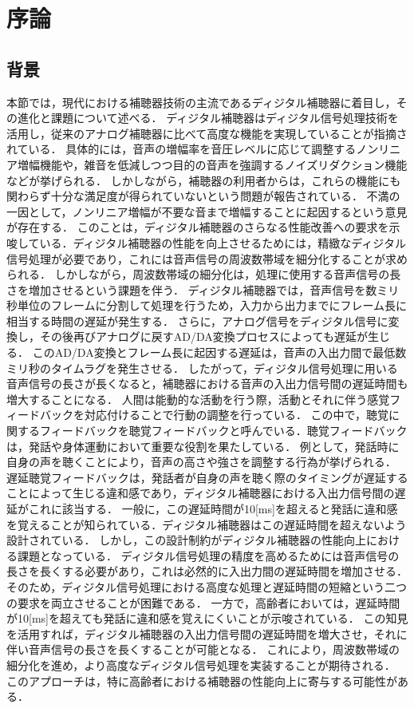 \chapter{序論}

\section{背景}
本節では，現代における補聴器技術の主流であるディジタル補聴器に着目し，その進化と課題について述べる．
ディジタル補聴器はディジタル信号処理技術を活用し，従来のアナログ補聴器に比べて高度な機能を実現していることが指摘されている\cite{EaringAids_20}．
具体的には，音声の増幅率を音圧レベルに応じて調整するノンリニア増幅機能や，雑音を低減しつつ目的の音声を強調するノイズリダクション機能などが挙げられる．
しかしながら，補聴器の利用者からは，これらの機能にも関わらず十分な満足度が得られていないという問題が報告されている\cite{Manzokudo}．
不満の一因として，ノンリニア増幅が不要な音まで増幅することに起因するという意見が存在する．
このことは，ディジタル補聴器のさらなる性能改善への要求を示唆している．ディジタル補聴器の性能を向上させるためには，精緻なディジタル信号処理が必要であり，これには音声信号の周波数帯域を細分化することが求められる．
しかしながら，周波数帯域の細分化は，処理に使用する音声信号の長さを増加させるという課題を伴う．
ディジタル補聴器では，音声信号を数ミリ秒単位のフレームに分割して処理を行うため，入力から出力までにフレーム長に相当する時間の遅延が発生する．
さらに，アナログ信号をディジタル信号に変換し，その後再びアナログに戻すAD/DA変換プロセスによっても遅延が生じる．
このAD/DA変換とフレーム長に起因する遅延は，音声の入出力間で最低数ミリ秒のタイムラグを発生させる．
したがって，ディジタル信号処理に用いる音声信号の長さが長くなると，補聴器における音声の入出力信号間の遅延時間も増大することになる．
人間は能動的な活動を行う際，活動とそれに伴う感覚フィードバックを対応付けることで行動の調整を行っている．
この中で，聴覚に関するフィードバックを聴覚フィードバックと呼んでいる\cite{DAF}．聴覚フィードバックは，発話や身体運動において重要な役割を果たしている．
例として，発話時に自身の声を聴くことにより，音声の高さや強さを調整する行為が挙げられる．
遅延聴覚フィードバックは，発話者が自身の声を聴く際のタイミングが遅延することによって生じる違和感であり，ディジタル補聴器における入出力信号間の遅延がこれに該当する．
一般に，この遅延時間が10[ms]を超えると発話に違和感を覚えることが知られている．ディジタル補聴器はこの遅延時間を超えないよう設計されている．
しかし，この設計制約がディジタル補聴器の性能向上における課題となっている．
ディジタル信号処理の精度を高めるためには音声信号の長さを長くする必要があり，これは必然的に入出力間の遅延時間を増加させる．
そのため，ディジタル信号処理における高度な処理と遅延時間の短縮という二つの要求を両立させることが困難である．
一方で，高齢者においては，遅延時間が10[ms]を超えても発話に違和感を覚えにくいことが示唆されている．
この知見を活用すれば，ディジタル補聴器の入出力信号間の遅延時間を増大させ，それに伴い音声信号の長さを長くすることが可能となる．
これにより，周波数帯域の細分化を進め，より高度なディジタル信号処理を実装することが期待される．
このアプローチは，特に高齢者における補聴器の性能向上に寄与する可能性がある．

